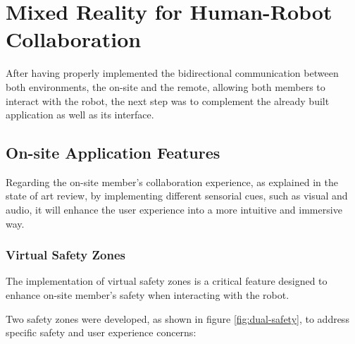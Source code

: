 \chapter{Mixed Reality for Human-Robot Collaboration}%
\label{chapter:on-site}

After having properly implemented the bidirectional communication between both environments, the on-site and the remote, allowing both members to interact with the robot, the next step was to complement the already built application as well as its interface. 

\section{On-site Application Features}
\label{section:on-site-features}
Regarding the on-site member's collaboration experience, as explained in the state of art review, by implementing different sensorial cues, such as visual and audio, it will enhance the user experience into a more intuitive and immersive way.
    
    \subsection{Virtual Safety Zones}
    \label{subsection:virtual-safety-zones} 

        The implementation of virtual safety zones is a critical feature designed to enhance on-site member's safety when interacting with the robot. 

        Two safety zones were developed, as shown in figure \ref{fig:dual-safety}, to address specific safety and user experience concerns:

